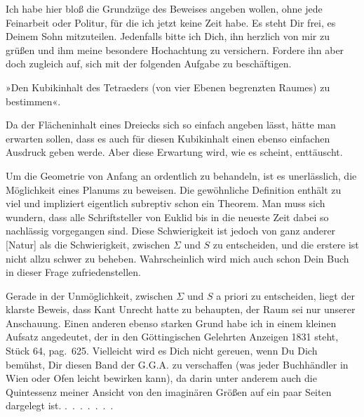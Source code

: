%
Ich habe hier bloß die Grundzüge des Beweises angeben wollen, ohne jede Feinarbeit oder Politur, für die ich jetzt keine Zeit habe. Es steht Dir frei, es Deinem Sohn mitzuteilen. Jedenfalls bitte ich Dich, ihn herzlich von mir zu grüßen und ihm meine besondere Hochachtung zu versichern. Fordere ihn aber doch zugleich auf, sich mit der folgenden Aufgabe zu beschäftigen.

»Den Kubikinhalt des Tetraeders (von vier Ebenen begrenzten Raumes) zu bestimmen«.

Da der Flächeninhalt eines Dreiecks sich so einfach angeben lässt, hätte man erwarten sollen, dass es auch für diesen Kubikinhalt einen ebenso einfachen Ausdruck geben werde. Aber diese Erwartung wird, wie es scheint, enttäuscht.

Um die Geometrie von Anfang an ordentlich zu behandeln, ist es unerlässlich, die Möglichkeit eines Planums zu beweisen. Die gewöhnliche Definition enthält zu viel und impliziert eigentlich subreptiv schon ein Theorem. Man muss sich wundern, dass alle Schriftsteller von Euklid bis in die neueste Zeit dabei so nachlässig vorgegangen sind. Diese Schwierigkeit ist jedoch von ganz anderer [Natur] als die Schwierigkeit, zwischen $\Sigma$ und $S$ zu entscheiden, und die erstere ist nicht allzu schwer zu beheben. Wahrscheinlich wird mich auch schon Dein Buch in dieser Frage zufriedenstellen.

Gerade in der Unmöglichkeit, zwischen $\Sigma$ und $S$ a priori zu entscheiden, liegt der klarste Beweis, dass Kant Unrecht hatte zu behaupten, der Raum sei nur  unserer Anschauung. Einen anderen ebenso starken Grund habe ich in einem kleinen Aufsatz angedeutet, der in den Göttingischen Gelehrten Anzeigen 1831 steht, Stück 64, pag.~625. Vielleicht wird es Dich nicht gereuen, wenn Du Dich bemühst, Dir diesen Band der G.G.A. zu verschaffen (was jeder Buchhändler in Wien oder Ofen leicht bewirken kann), da darin unter anderem auch die Quintessenz meiner Ansicht von den imaginären Größen auf ein paar Seiten dargelegt ist. \mbox{.\ .\ .\ .\ .\ .\ .}

